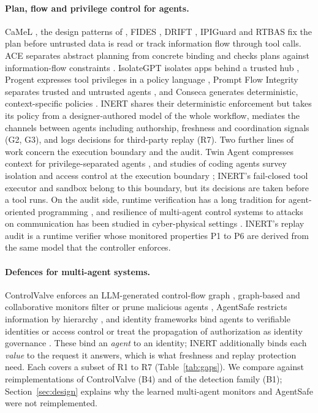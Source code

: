 \documentclass[pdflatex,sn-mathphys-num]{sn-jnl}
\theoremstyle{thmstyleone}%
\theoremstyle{thmstyletwo}%
\theoremstyle{thmstylethree}%
\begin{document}
\paragraph{Plan, flow and privilege control for agents.} CaMeL \citep{debenedetti2025camel}, the design patterns of \citet{beurerkellner2025patterns}, FIDES \citep{wu2024ifc}, DRIFT \citep{li2025drift}, IPIGuard \citep{an2025ipiguard} and RTBAS \citep{zhong2025rtbas} fix the plan before untrusted data is read or track information flow through tool calls. ACE separates abstract planning from concrete binding and checks plans against information-flow constraints \citep{li2026ace}. IsolateGPT isolates apps behind a trusted hub \citep{wu2025isolategpt}, Progent expresses tool privileges in a policy language \citep{shi2025progent}, Prompt Flow Integrity separates trusted and untrusted agents \citep{kim2025pfi}, and Conseca generates deterministic, context-specific policies \citep{tsai2025conseca}. INERT shares their deterministic enforcement but takes its policy from a designer-authored model of the whole workflow, mediates the channels between agents including authorship, freshness and coordination signals (G2, G3), and logs decisions for third-party replay (R7). Two further lines of work concern the execution boundary and the audit. Twin Agent compresses context for privilege-separated agents \citep{Hu2026TwinACI}, and studies of coding agents survey isolation and access control at the execution boundary \citep{Rashidi2026TheBOBQ}; INERT's fail-closed tool executor and sandbox belong to this boundary, but its decisions are taken before a tool runs. On the audit side, runtime verification has a long tradition for agent-oriented programming \citep{Engelmann2022RV4JaCaRBL}, and resilience of multi-agent control systems to attacks on communication has been studied in cyber-physical settings \citep{Taheri2020MitigationARBP}. INERT's replay audit is a runtime verifier whose monitored properties P1 to P6 are derived from the same model that the controller enforces.

\paragraph{Defences for multi-agent systems.} ControlValve enforces an LLM-generated control-flow graph \citep{jha2025controlvalve}, graph-based and collaborative monitors filter or prune malicious agents \citep{Wang2025GSafeguardATAW,Miao2025BlindGuardSLAV,zeng2024autodefense}, AgentSafe restricts information by hierarchy \citep{Mao2025AgentSafeSLY}, and identity frameworks bind agents to verifiable identities or access control \citep{Zou2025BlockA2ATSAC,Narajala2025SecuringGMAU,Ji2026TamingVPAP} or treat the propagation of authorization as identity governance \citep{Tallam2026AuthorizationPIBH}. These bind an \emph{agent} to an identity; INERT additionally binds each \emph{value} to the request it answers, which is what freshness and replay protection need. Each covers a subset of R1 to R7 (Table~\ref{tab:gaps}). We compare against reimplementations of ControlValve (B4) and of the detection family (B1); Section~\ref{sec:design} explains why the learned multi-agent monitors and AgentSafe were not reimplemented.
\end{document}
